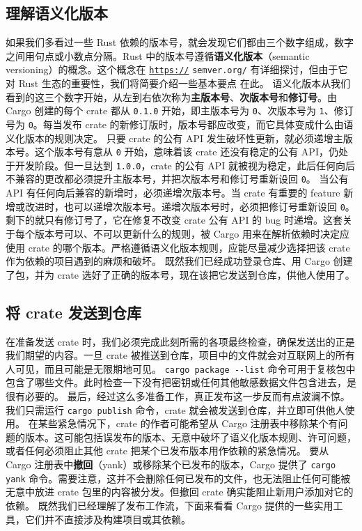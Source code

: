 \subsection{理解语义化版本}
\label{idx:idx_8fecfffe}
\label{idx:idx_53d877f0}
\label{idx:idx_03575d81}
如果我们多看过一些 Rust 依赖的版本号，就会发现它们都由三个数字组成，数字之间用句点或小数点分隔。Rust 中的版本号遵循\textbf{语义化版本}（semantic versioning）的概念。这个概念在 \href{https://}{\texttt{https://}}
\texttt{semver.org/} 有详细探讨，但由于它对 Rust 生态的重要性，我们将简要介绍一些基本要点
在此。
\label{idx:idx_2139029e}
\label{idx:idx_8631aae5}
\label{idx:idx_662755a2}
语义化版本从我们看到的这三个数字开始，从左到右依次称为\textbf{主版本号}、\textbf{次版本号}和\textbf{修订号}。由 Cargo 创建的每个 crate 都从 \texttt{0.1.0} 开始，即主版本号为 \texttt{0}、次版本号为 \texttt{1}、修订号为 \texttt{0}。每当发布 crate 的新修订版时，版本号都应改变，而它具体变成什么由语义化版本的规则决定。
只要 crate 的公有 API 发生破坏性更新，就必须递增主版本号。这个版本号有意从 \texttt{0} 开始，意味着该 crate 还没有稳定的公有 API，仍处于开发阶段。但一旦达到 \texttt{1.0.0}，crate 的公有 API 就被视为稳定，此后任何向后不兼容的更改都必须提升主版本号，并把次版本号和修订号重新设回 \texttt{0}。
当公有 API 有任何向后兼容的新增时，必须递增次版本号。当 crate 有重要的 feature 新增或改进时，也可以递增次版本号。递增次版本号时，必须把修订号重新设回 \texttt{0}。
\label{idx:idx_bc4e6bdc}
\label{idx:idx_caf81e31}
剩下的就只有修订号了，它在修复不改变 crate 公有 API 的 bug 时递增。这套关于每个版本号可以、不可以更新什么的规则，被 Cargo 用来在解析依赖时决定应使用 crate 的哪个版本。严格遵循语义化版本规则，应能尽量减少选择把该 crate 作为依赖的项目遇到的麻烦和破坏。
既然我们已经成功登录仓库、用 Cargo 创建了包，并为 crate 选好了正确的版本号，现在该把它发送到仓库，供他人使用了。
\subsection{将 crate 发送到仓库}
\label{idx:idx_7b138472}
在准备发送 crate 时，我们必须完成此刻所需的各项最终检查，确保发送出的正是我们期望的内容。一旦 crate 被推送到仓库，项目中的文件就会对互联网上的所有人可见，而且可能是无限期地可见。
\texttt{cargo package -\allowbreak{}-\allowbreak{}list} 命令可用于复核包中包含了哪些文件。此时检查一下没有把密钥或任何其他敏感数据文件包含进去，是很有必要的。
最后，经过这么多准备工作，真正发布这一步反而有点波澜不惊。我们只需运行 \texttt{cargo publish} 命令，crate 就会被发送到仓库，并立即可供他人使用。
在某些紧急情况下，crate 的作者可能希望从 Cargo 注册表中移除某个有问题的版本。这可能包括误发布的版本、无意中破坏了语义化版本规则、许可问题，或者任何必须阻止其他 crate 把某个已发布版本用作依赖的紧急情况。
\label{idx:idx_4c74ec48}
要从 Cargo 注册表中\textbf{撤回}（yank）或移除某个已发布的版本，Cargo 提供了 \texttt{cargo yank} 命令。需要注意，这并不会删除任何已发布的文件，也无法阻止任何可能被无意中放进 crate 包里的内容被分发。但撤回 crate 确实能阻止新用户添加对它的依赖。
既然我们已经理解了发布工作流，下面来看看 Cargo 提供的一些实用工具，它们并不直接涉及构建项目或其依赖。
